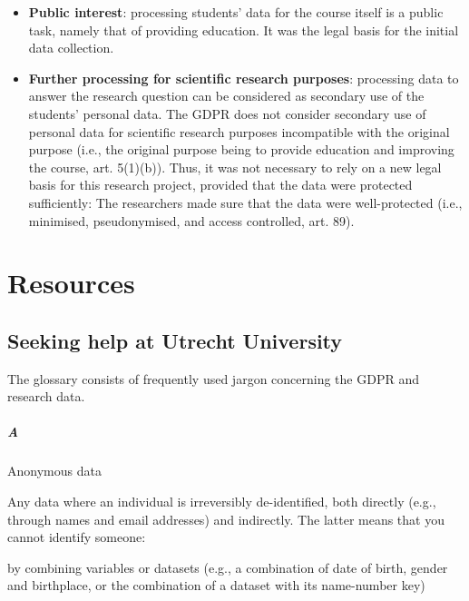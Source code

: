 \documentclass[
]{book}
\providecommand{\tightlist}{%
  \setlength{\itemsep}{0pt}\setlength{\parskip}{0pt}}
\begin{document}
\begin{itemize}
  \begin{itemize}
  \tightlist
  \item
    \textbf{Public interest}: processing students' data for the course itself is a
    public task, namely that of providing education. It was the legal basis for
    the initial data collection.
  \item
    \textbf{Further processing for scientific research purposes}: processing data to
    answer the research question can be considered as secondary use of the
    students' personal data. The GDPR does not consider secondary use of personal
    data for scientific research purposes incompatible with the original purpose
    (i.e., the original purpose being to provide education and improving the
    course, art. 5(1)(b)).
    Thus, it was not necessary to rely on a new legal basis for this research
    project, provided that the data were protected sufficiently: The researchers
    made sure that the data were well-protected (i.e., minimised, pseudonymised,
    and access controlled, art. 89).
  \end{itemize}
\end{itemize}

\hypertarget{part-resources}{%
\part*{Resources}\label{part-resources}}

\hypertarget{seeking-help}{%
\chapter{Seeking help at Utrecht University}\label{seeking-help}}

The glossary consists of frequently used jargon concerning the GDPR and research data.

\hypertarget{a}{%
\subsubsection{A}\label{a}}

Anonymous data

Any data where an individual is irreversibly de-identified, both directly (e.g., through names and email addresses) and indirectly. The latter means that you cannot identify someone:

by combining variables or datasets (e.g., a combination of date of birth, gender and birthplace, or the combination of a dataset with its name-number key)
\end{document}
